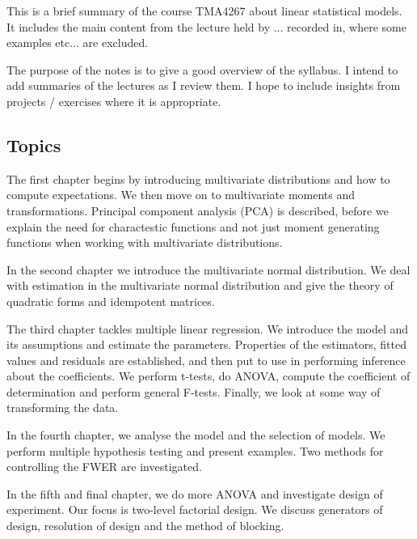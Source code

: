 
This is a brief summary of the course TMA4267 about linear statistical models. It includes the main content from the lecture held by \TODO{}... recorded in, where some examples etc... are excluded. 

The purpose of the notes is to give a good overview of the syllabus. I intend to add summaries of the lectures as I review them. I hope to include insights from projects / exercises where it is appropriate. 

\subsection*{Topics}
The first chapter begins by introducing multivariate distributions and how to compute expectations. We then move on to multivariate moments and transformations. Principal component analysis (PCA) is described, before we explain the need for charactestic functions and not just moment generating functions when working with multivariate distributions. 

In the second chapter we introduce the multivariate normal distribution. We deal with estimation in the multivariate normal distribution and give the theory of quadratic forms and idempotent matrices.

The third chapter tackles multiple linear regression. We introduce the model and its assumptions and estimate the parameters. Properties of the estimators, fitted values and residuals are established, and then put to use in performing inference about the coefficients. We perform t-tests, do ANOVA, compute the coefficient of determination and perform general F-tests. Finally, we look at some way of transforming the data.

In the fourth chapter, we analyse the model and the selection of models. We perform multiple hypothesis testing and present examples. Two methods for controlling the FWER are investigated.

In the fifth and final chapter, we do more ANOVA and investigate design of experiment. Our focus is two-level factorial design. We discuss generators of design, resolution of design and the method of blocking. 